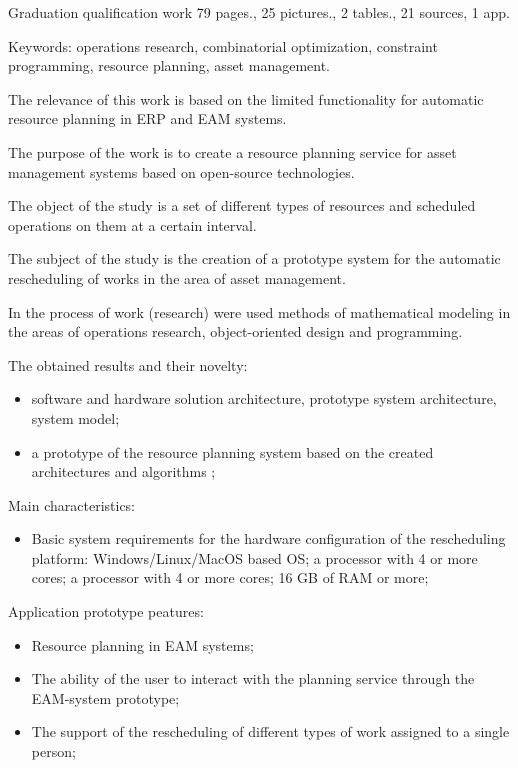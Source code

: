 
Graduation qualification work 79 pages., 25 pictures., 2 tables., 21 sources, 1 app.

Keywords: operations research, combinatorial optimization, constraint programming, resource planning, asset management.

The relevance of this work is based on the limited functionality for automatic resource planning in ERP and EAM systems.

The purpose of the work is to create a resource planning service for asset management systems based on open-source technologies.


The object of the study is a set of different types of resources and scheduled operations on them at a certain interval.

The subject of the study is the creation of a prototype system for the automatic rescheduling of works in the area of asset management.

In the process of work (research) were used methods of mathematical modeling in the areas of operations research, object-oriented design and programming.

The obtained results and their novelty:

\begin{itemize}
    \item software and hardware solution architecture, prototype system architecture, system model;
    \item a prototype of the resource planning system based on the created architectures and algorithms ;
\end{itemize}

Main characteristics:

\begin{itemize}
    \item Basic system requirements for the hardware configuration of the rescheduling platform: Windows/Linux/MacOS based OS; a processor with 4 or more cores; a processor with 4 or more cores; 16 GB of RAM or more;
\end{itemize}

Application prototype peatures:
\begin{itemize}
    \item Resource planning in EAM systems;
    \item The ability of the user to interact with the planning service through the EAM-system prototype;
    \item The support of the rescheduling of different types of work assigned to a single person;
\end{itemize}

